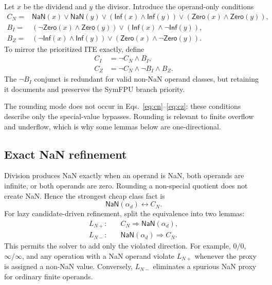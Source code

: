 \documentclass[runningheads]{llncs}
\newcommand{\isnan}{\mathsf{NaN}}
\newcommand{\isinf}{\mathsf{Inf}}
\newcommand{\iszero}{\mathsf{Zero}}
\newcommand{\proxy}{\alpha_d}
\begin{document}
Let \(x\) be the dividend and \(y\) the divisor.  Introduce the operand-only
conditions
\begin{align}
  C_N ={}& \isnan(x) \lor \isnan(y)
       \lor (\isinf(x) \land \isinf(y))
       \lor (\iszero(x) \land \iszero(y)),
       \label{eq:cn}\\
  B_I ={}& (\neg\iszero(x) \land \iszero(y))
       \lor (\isinf(x) \land \neg\isinf(y)),
       \label{eq:bi}\\
  B_Z ={}& (\neg\isinf(x) \land \isinf(y))
       \lor (\iszero(x) \land \neg\iszero(y)).
       \label{eq:bz}
\end{align}
To mirror the prioritized ITE exactly, define
\begin{align}
  C_I & = \neg C_N \land B_I,
       \label{eq:ci}\\
  C_Z & = \neg C_N \land \neg B_I \land B_Z.
       \label{eq:cz}
\end{align}
The \(\neg B_I\) conjunct is redundant for valid non-NaN operand classes, but
retaining it documents and preserves the SymFPU branch priority.

The rounding mode does not occur in Eqs.~\eqref{eq:cn}--\eqref{eq:cz}:
these conditions describe only the special-value bypasses.  Rounding is
relevant to finite overflow and underflow, which is why some lemmas below are
one-directional.

\subsection{Exact NaN refinement}
\label{subsec:nan}

Division produces NaN exactly when an operand is NaN, both operands are
infinite, or both operands are zero.  Rounding a non-special quotient does not
create NaN.  Hence the strongest cheap class fact is
\[
  \isnan(\proxy) \leftrightarrow C_N.
  \tag{NAN}
\]
For lazy candidate-driven refinement, split the equivalence into two lemmas:
\begin{align}
  L_{N+}:&\quad C_N \Longrightarrow \isnan(\proxy),
       \label{lem:nan-pos}\\
  L_{N-}:&\quad \isnan(\proxy) \Longrightarrow C_N.
       \label{lem:nan-neg}
\end{align}
This permits the solver to add only the violated direction.  For example,
\(0/0\), \(\infty/\infty\), and any operation with a NaN operand violate
\(L_{N+}\) whenever the proxy is assigned a non-NaN value.  Conversely,
\(L_{N-}\) eliminates a spurious NaN proxy for ordinary finite operands.
\end{document}
